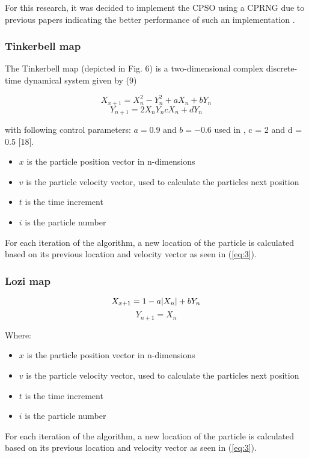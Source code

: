 \documentclass[conference]{IEEEtran}
\begin{document}
	For this research, it was decided to implement the \ac{CPSO} using a \ac{CPRNG} due to previous papers indicating the better performance of such an implementation \cite{pluhacek:cpso-cprng-imp}.

	\subsubsection{Tinkerbell map}

	The Tinkerbell map (depicted in Fig. 6) is a two-dimensional complex discrete-time dynamical system given by (9)

	\begin{equation} \label{eq:3}
	X_{x+1} = X_n^2 - Y_n^2 + aX_n + bY_n
	\end{equation}
	\begin{equation} \label{eq:4}
	Y_{n+1} = 2X_nY_n cX_n + dY_n
	\end{equation}

\noindent with following control parameters: $ a = 0.9 $ and $ b = -0.6 $ used in , c = 2 and d = 0.5 [18].
	\begin{itemize}
		\item $x$ is the particle position vector in n-dimensions
		\item $v$ is the particle velocity vector, used to calculate the particles next position
		\item $t$ is the time increment
		\item $i$ is the particle number
	\end{itemize}
	\vspace{5mm}
	\noindent For each iteration of the algorithm, a new location of the particle is calculated based on its previous location and velocity vector as seen in (\ref{eq:3}).

	\subsubsection{Lozi map}

	\begin{equation} \label{eq:5}
	X_{x+1} = 1 - a \abs{X_n} + bY_n
	\end{equation}
	\begin{equation} \label{eq:6}
	Y_{n+1} = X_n
	\end{equation}

	\noindent Where:
	\begin{itemize}
		\item $x$ is the particle position vector in n-dimensions
		\item $v$ is the particle velocity vector, used to calculate the particles next position
		\item $t$ is the time increment
		\item $i$ is the particle number
	\end{itemize}
	\vspace{5mm}
	\noindent For each iteration of the algorithm, a new location of the particle is calculated based on its previous location and velocity vector as seen in (\ref{eq:3}).
\end{document}
